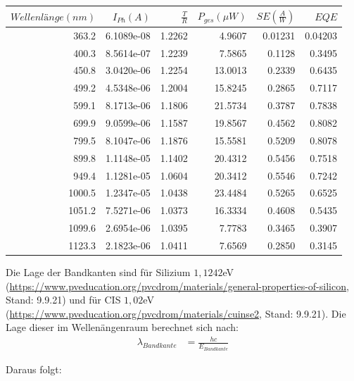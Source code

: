 \begin{center}
\begin{tabular}{rrrrrr}
    $Wellenlänge (nm)$ &  $I_{Ph} (A)$ &    $\frac{T}{R}$ &  $P_{ges} (\mu W)$ &  $SE (\frac{A}{W})$ &       $EQE$ \\
    \hline
    363.2 &  6.1089e-08 &  1.2262 &    4.9607 &  0.01231 &  0.04203 \\
    400.3 &  8.5614e-07 &  1.2239 &    7.5865 &  0.1128 &   0.3495 \\
    450.8 &  3.0420e-06 &  1.2254 &   13.0013 &  0.2339 &   0.6435 \\
    499.2 &  4.5348e-06 &  1.2004 &   15.8245 &  0.2865 &   0.7117 \\
    599.1 &  8.1713e-06 &  1.1806 &   21.5734 &  0.3787 &   0.7838 \\
    699.9 &  9.0599e-06 &  1.1587 &   19.8567 &  0.4562 &   0.8082 \\
    799.5 &  8.1047e-06 &  1.1876 &   15.5581 &  0.5209 &   0.8078 \\
    899.8 &  1.1148e-05 &  1.1402 &   20.4312 &  0.5456 &   0.7518 \\
    949.4 &  1.1281e-05 &  1.0604 &   20.3412 &  0.5546 &   0.7242 \\
    1000.5 &  1.2347e-05 &  1.0438 &   23.4484 &  0.5265 &   0.6525 \\
    1051.2 &  7.5271e-06 &  1.0373 &   16.3334 &  0.4608 &   0.5435 \\
    1099.6 &  2.6954e-06 &  1.0395 &    7.7783 &  0.3465 &   0.3907 \\
    1123.3 &  2.1823e-06 &  1.0411 &    7.6569 &  0.2850 &   0.3145 \\

\end{tabular}
\label{tab:32cis}
\end{center}

Die Lage der Bandkanten sind für Silizium $1,1242$eV 
(\url{https://www.pveducation.org/pvcdrom/materials/general-properties-of-silicon}, Stand: 9.9.21) und für CIS $1,02$eV 
(\url{https://www.pveducation.org/pvcdrom/materials/cuinse2}, Stand: 9.9.21). Die Lage dieser im Wellenängenraum berechnet sich nach: \\

\begin{align}
\lambda_{Bandkante} &= \frac{hc}{E_{Bandkante}}
\end{align}

Daraus folgt: \\


